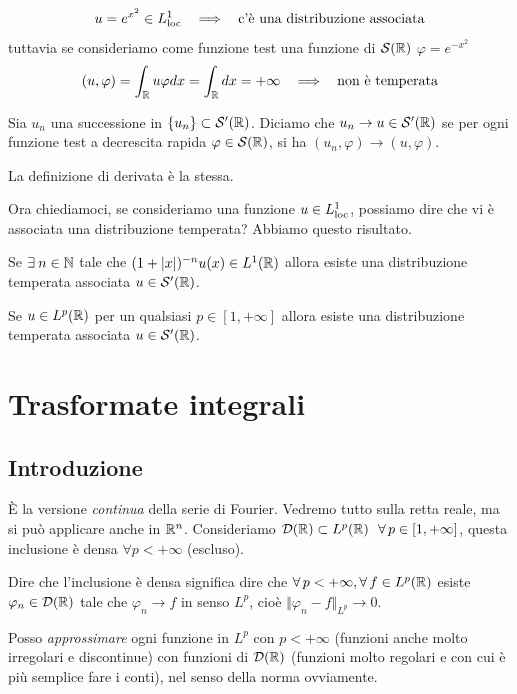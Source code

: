 \begin{equation*}
u = e^{x^{2}} \in L^{1}_{\loc} \ \ \implies \ \ \text{c'è una distribuzione associata}
\end{equation*}
tuttavia se consideriamo come funzione test una funzione di $\mathcal{S}(\mathbb{R})$ $\varphi = e^{- x^{2}}$
\begin{equation*}
(u, \varphi) = \int_{\mathbb{R}} u\varphi dx = \int_{\mathbb{R}} dx = + \infty \ \ \implies \ \ \text{non è temperata}
\end{equation*}
\begin{defn}
Sia $u_{n}$ una successione in $\{u_{n}\} \subset \mathcal{S}'(\mathbb{R})$. Diciamo che $u_{n}\rightarrow u\in \mathcal{S}'(\mathbb{R})$ se per ogni funzione test a decrescita rapida $\varphi \in \mathcal{S}(\mathbb{R})$, si ha $(u_{n}, \varphi)\rightarrow (u, \varphi)$.
\end{defn}
La definizione di derivata è la stessa.

Ora chiediamoci, se consideriamo una funzione $u\in L^{1}_{\operatorname{loc}}$, possiamo dire che vi è associata una distribuzione temperata? Abbiamo questo risultato.
\begin{thm}
Se $\exists n\in \NN$ tale che $(1 + | x|)^{- n} u(x) \in L^{1}(\mathbb{R})$ allora esiste una distribuzione temperata associata $u\in \mathcal{S}'(\mathbb{R})$.
\end{thm}
\begin{thm}
Se $u\in L^{p}(\mathbb{R})$ per un qualsiasi $p\in [1, + \infty]$ allora esiste una distribuzione temperata associata $u\in \mathcal{S}'(\mathbb{R})$.
\end{thm}

\chapter{Trasformate integrali}

\section{Introduzione}

È la versione \textit{continua} della serie di Fourier. Vedremo tutto sulla retta reale, ma si può applicare anche in $\mathbb{R}^{n}$. Consideriamo $\Dc(\RR) \subset L^{p}(\RR) \ \ \forall p\in [1, + \infty]$, questa inclusione è densa $\forall p < + \infty $ (escluso).
\begin{defn}
Dire che l'inclusione è densa significa dire che $\forall p < + \infty, \forall f\in L^{p}(\RR)$ esiste $\varphi_{n} \in \mathcal{D}(\mathbb{R})$ tale che $\varphi_{n}\rightarrow f$ in senso $L^{p}$, cioè $ \Vert \varphi_{n} - f \Vert_{L^{p}}\rightarrow 0$.
\end{defn}
Posso \textit{approssimare} ogni funzione in $L^{p}$ con $p < + \infty $ (funzioni anche molto irregolari e discontinue) con funzioni di $\mathcal{D}(\mathbb{R})$ (funzioni molto regolari e con cui è più semplice fare i conti), nel senso della norma ovviamente.

